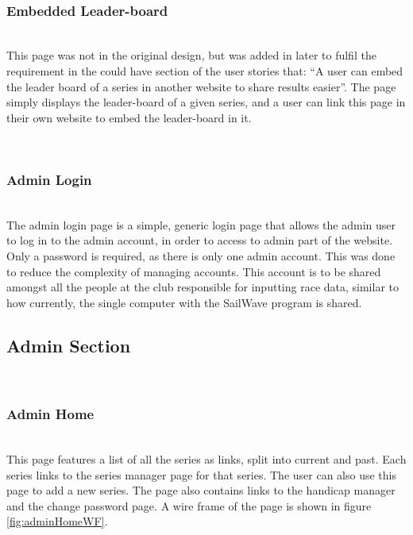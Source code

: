 \documentclass{l4proj}
\begin{document}
\hfill\\
\subsubsection{Embedded Leader-board}
\hfill\\
This page was not in the original design, but was added in later to fulfil the requirement in the could have section of the user stories that: “A user can embed the leader board of a series in another website to share results easier”. The page simply displays the leader-board of a given series, and a user can link this page in their own website to embed the leader-board in it.

\hfill\\
\subsubsection{Admin Login}
\hfill\\
The admin login page is a simple, generic login page that allows the admin user to log in to the admin account, in order to access to admin part of the website. Only a password is required, as there is only one admin account. This was done to reduce the complexity of managing accounts. This account is to be shared amongst all the people at the club responsible for inputting race data, similar to how currently, the single computer with the SailWave program is shared.

\subsection{Admin Section}

\hfill\\
\subsubsection{Admin Home}
\hfill\\
This page features a list of all the series as links, split into current and past. Each series links to the series manager page for that series. The user can also use this page to add a new series. The page also contains links to the handicap manager and the change password page. A wire frame of the page is shown in figure \ref{fig:adminHomeWF}.
\end{document}
